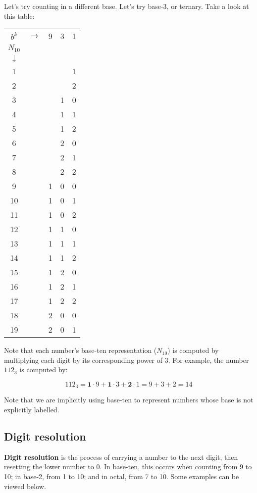\documentclass{article}
\begin{document}
\noindent Let's try counting in a different base. Let's try base-3, or ternary. Take a look at this table:

\begin{center}
\begin{tabular} {c c c c c}
$b^k$ & $\rightarrow$ & 9 & 3 & 1\\
$N_{10}$\\
$\downarrow$\\
1 & & & & 1\\
2 & & & & 2\\
3 & & & 1 & 0\\
4 & & & 1 & 1\\
5 & & & 1 & 2\\
6 & & & 2 & 0\\
7 & & & 2 & 1\\
8 & & & 2 & 2\\
9 & & 1 & 0 & 0\\
10& & 1 & 0 & 1\\
11& & 1 & 0 & 2\\
12& & 1 & 1 & 0\\
13& & 1 & 1 & 1\\
14& & 1 & 1 & 2\\
15& & 1 & 2 & 0\\
16& & 1 & 2 & 1\\
17& & 1 & 2 & 2\\
18& & 2 & 0 & 0\\
19& & 2 & 0 & 1
\end{tabular}
\end{center}

\noindent Note that each number's base-ten representation ($N_{10}$) is computed by multiplying each digit by its corresponding power of 3. For example, the number $112_3$ is computed by:

\begin{equation}112_3 = \textbf{1} \cdot 9 + \textbf{1} \cdot 3 + \textbf{2} \cdot 1 = 9 + 3 + 2 = 14\end{equation}

\noindent Note that we are implicitly using base-ten to represent numbers whose base is not explicitly labelled.

\subsection{Digit resolution}

\noindent \textbf{Digit resolution} is the process of carrying a number to the next digit, then resetting the lower number to 0. In base-ten, this occurs when counting from 9 to 10; in base-2, from 1 to 10; and in octal, from 7 to 10. Some examples can be viewed below.
\end{document}
